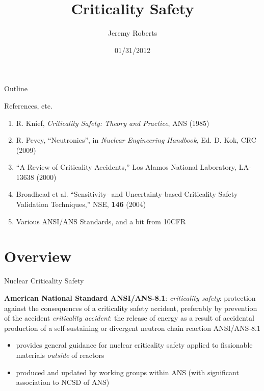 \documentclass[10pt]{beamer}
\title %
[Criticality Safety]{Criticality Safety}
\author[Roberts]{Jeremy Roberts}
\institute[22.106] %
 {}
\date
{01/31/2012}
\begin{document}
\begin{frame}[plain]
  \titlepage
\end{frame}

\begin{frame}{Outline}
  \tableofcontents
\end{frame}

\begin{frame}{References, etc.}
\begin{enumerate}
 \item R. Knief, {\it Criticality Safety: Theory and Practice}, ANS (1985)
 \item R. Pevey, ``Neutronics'', in {\it Nuclear Engineering Handbook},
       Ed. D. Kok, CRC (2009)
 \item ``A Review of Criticality  Accidents,'' Los Alamos National Laboratory,
       LA-13638 (2000)
 \item Broadhead et al. ``Sensitivity- and Uncertainty-based Criticality 
       Safety Validation Techniques,'' NSE, {\bf 146} (2004)
 \item Various ANSI/ANS Standards, and a bit from 10CFR
\end{enumerate}
\end{frame}

\section{Overview}

\begin{frame}{Nuclear Criticality Safety}

{\bf American National Standard ANSI/ANS-8.1}:
\vfill
{\it criticality safety}: protection against the consequences of a criticality 
safety accident, preferably by prevention of the accident
\vfill
{\it criticality accident}: the release of energy as a 
result of accidental production of a self-sustaining or
divergent neutron chain reaction
\vfill 
ANSI/ANS-8.1 
\begin{itemize}
 \item provides general guidance for  nuclear criticality safety 
       applied to fissionable materials \textit{outside} of reactors
 \item produced and updated by working groups within ANS (with significant
       association to NCSD of ANS)
\end{itemize}

\end{frame}
\end{document}
